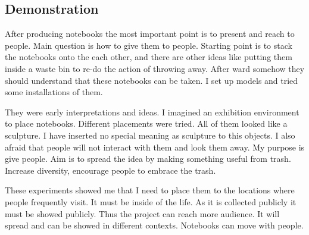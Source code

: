 \subsection{Demonstration}
After producing notebooks the most important point is to present and reach to people. Main question is how to give them to people. Starting point is to stack the notebooks onto the each other, and there are other ideas like putting them inside a waste bin to re-do the action of throwing away. After ward somehow they should understand that these notebooks can be taken. I set up models and tried some installations of them.


They were early interpretations and ideas. I imagined an exhibition environment to place notebooks. Different placements were tried. All of them looked like a sculpture. I have inserted no special meaning as sculpture to this objects. I also afraid that people will not interact with them and look them away. My purpose is give people. Aim is to spread the idea by making something useful from trash. Increase diversity, encourage people to embrace the trash.

These experiments showed me that I need to place them to the locations where people frequently visit. It must be inside of the life. As it is collected publicly it must be showed publicly. Thus the project can reach more audience. It will spread and can be showed in different contexts. Notebooks can move with people.

